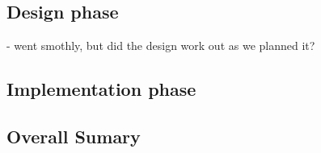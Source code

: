     \subsection{Design phase} - went smothly, but did the design work out as we planned it?
    \subsection{Implementation phase}
    \subsection{Overall Sumary}    


